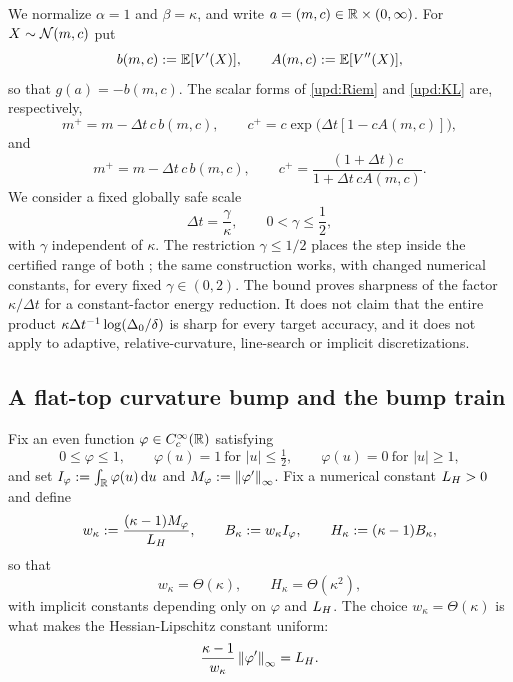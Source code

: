 We normalize $\alpha=1$ and $\beta=\kappa$, and write $a=(m,c)\in\mathbb{R}\times(0,\infty)$. For
$X\sim\mathcal{N}(m,c)$ put
\begin{equation}\label{eq:bump-bA}
    b(m,c):=\mathbb{E}[V'(X)],
    \qquad
    A(m,c):=\mathbb{E}[V''(X)],
\end{equation}
so that $g(a)=-b(m,c)$. The scalar forms of \eqref{upd:Riem} and \eqref{upd:KL} are,
respectively,
\begin{equation}\label{eq:bump-R-map}
    m^+=m-\Delta t\,c\,b(m,c),
    \qquad
    c^+=c\exp\bigl(\Delta t[1-cA(m,c)]\bigr),
\end{equation}
and
\begin{equation}\label{eq:bump-KL-map}
    m^+=m-\Delta t\,c\,b(m,c),
    \qquad
    c^+=\frac{(1+\Delta t)c}{1+\Delta t\,cA(m,c)} .
\end{equation}
We consider a fixed globally safe scale
\begin{equation}\label{eq:bump-step}
    \Delta t=\frac\gamma\kappa,
    \qquad
    0<\gamma\leq\frac12,
\end{equation}
with $\gamma$ independent of $\kappa$. The restriction $\gamma\leq1/2$ places the step inside
the certified range of both ; the same construction works, with
changed numerical constants, for every fixed $\gamma\in(0,2)$. The bound proves sharpness of
the factor $\kappa/\Delta t$ for a constant-factor energy reduction. It does not claim that the
entire product $\kappa\Delta t^{-1}\log(\Delta_0/\delta)$ is sharp for every target accuracy,
and it does not apply to adaptive, relative-curvature, line-search or implicit
discretizations.

\subsection{A flat-top curvature bump and the bump train}

Fix an even function $\varphi\in C_c^\infty(\mathbb{R})$ satisfying
\begin{equation}\label{eq:flat-bump}
    0\leq\varphi\leq1,
    \qquad
    \varphi(u)=1\ \text{for }|u|\leq\tfrac12,
    \qquad
    \varphi(u)=0\ \text{for }|u|\geq1,
\end{equation}
and set $I_\varphi:=\int_{\mathbb{R}}\varphi(u)\,\mathrm{d} u$ and $M_\varphi:=\left\lVert \varphi'\right\rVert_\infty$. Fix a
numerical constant $L_H>0$ and define
\begin{equation}\label{eq:bump-width-mass}
    w_\kappa:=\frac{(\kappa-1)M_\varphi}{L_H},
    \qquad
    B_\kappa:=w_\kappa I_\varphi,
    \qquad
    H_\kappa:=(\kappa-1)B_\kappa,
\end{equation}
so that
\begin{equation}\label{eq:bump-scales}
    w_\kappa=\Theta(\kappa),
    \qquad
    H_\kappa=\Theta(\kappa^2),
\end{equation}
with implicit constants depending only on $\varphi$ and $L_H$. The choice
$w_\kappa=\Theta(\kappa)$ is what makes the Hessian-Lipschitz constant uniform:
\begin{equation}\label{eq:bump-LH}
    \frac{\kappa-1}{w_\kappa}\left\lVert \varphi'\right\rVert_\infty=L_H .
\end{equation}

